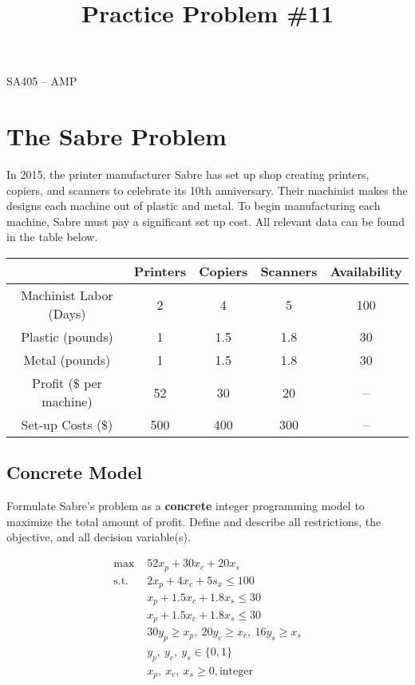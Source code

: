 \documentclass[11pt]{article}
\makeatletter
\theoremstyle{definition}
\renewcommand{\maketitle}{
  \noindent SA405 -- AMP \hfill\\

  \begin{center}\Large{\textbf{\@title}}\end{center}
}
\makeatother
\begin{document}
  
\title{Practice Problem \#11}

\maketitle

\section{The Sabre Problem}
In 2015, the printer manufacturer Sabre has set up shop creating printers,
copiers, and scanners to celebrate its 10th anniversary. Their machinist makes the
designs each machine out of plastic and metal. To begin manufacturing each machine, Sabre must pay a significant set up cost. All relevant data can be found in the table below.

\begin{center}
\begin{tabular}{|c|c|c|c|c|} \hline
 & Printers & Copiers & Scanners & Availability\\ \hline
Machinist Labor (Days) & 2 & 4 & 5 & 100 \\ \hline
Plastic (pounds) & 1& 1.5 & 1.8 & 30 \\ \hline
Metal (pounds) & 1& 1.5 & 1.8 & 30 \\ \hline
Profit (\$ per machine) & 52 & 30 & 20 &-- \\ \hline
Set-up Costs (\$) & 500 & 400 & 300  & -- \\ \hline
\end{tabular}
\end{center}
\subsection{Concrete Model}
Formulate Sabre's problem as a \textbf{concrete} integer programming model to maximize the total amount of profit. Define and describe all restrictions, the objective, and all decision variable(s).

\begin{align*}
\textrm{max } & 52x_p + 30x_c + 20x_s \\
\textrm{s.t. } & 2x_p + 4x_c + 5s_x \le 100 \\
& x_p + 1.5x_c + 1.8x_s \le 30 \\
& x_p + 1.5x_c + 1.8x_s \le 30 \\
& 30y_p \ge x_p, \ 20y_c \ge x_c, \ 16y_s \ge x_s \\
& y_p, \ y_c, \ y_s \in \{0,1\} \\
& x_p, \ x_c, \ x_s \ge 0, \textrm{integer}
\end{align*}
\end{document}
